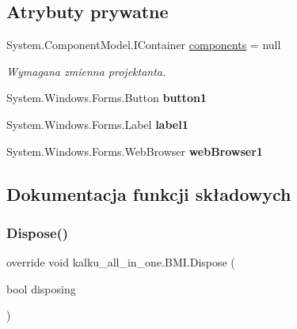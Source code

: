 \subsection*{Atrybuty prywatne}
\begin{DoxyCompactItemize}
\item 
System.\+Component\+Model.\+I\+Container \mbox{\hyperlink{classkalku__all__in__one_1_1_b_m_i_a22ba14d3b8edf8bd543f0fb2aeeeb98f}{components}} = null
\begin{DoxyCompactList}\small\item\em Wymagana zmienna projektanta. \end{DoxyCompactList}\item 
\mbox{\label{classkalku__all__in__one_1_1_b_m_i_aa26712eb9c9ec5693a336b346b58b62d}} 
System.\+Windows.\+Forms.\+Button {\bfseries button1}
\item 
\mbox{\label{classkalku__all__in__one_1_1_b_m_i_a7cc20782be85989a5e259b0fe2f5ed57}} 
System.\+Windows.\+Forms.\+Label {\bfseries label1}
\item 
\mbox{\label{classkalku__all__in__one_1_1_b_m_i_a4aada71c559694faccee5e79c80242fe}} 
System.\+Windows.\+Forms.\+Web\+Browser {\bfseries web\+Browser1}
\end{DoxyCompactItemize}


\subsection{Dokumentacja funkcji składowych}
\mbox{\label{classkalku__all__in__one_1_1_b_m_i_a1264455b68083a34b6c3e7e32198052d}} 
\subsubsection{\texorpdfstring{Dispose()}{Dispose()}}
{\footnotesize\ttfamily override void kalku\+\_\+all\+\_\+in\+\_\+one.\+B\+M\+I.\+Dispose (\begin{DoxyParamCaption}\item[{bool}]{disposing }\end{DoxyParamCaption})\hspace{0.3cm}{\ttfamily [protected]}}



